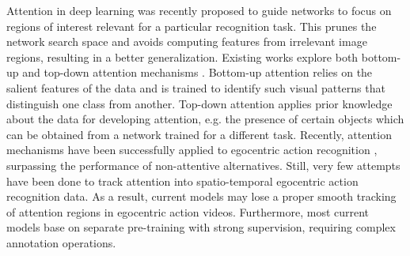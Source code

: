 \documentclass[10pt,twocolumn,letterpaper]{article}
\begin{document}
Attention in deep learning was recently proposed to guide networks to focus on regions of interest relevant for a particular recognition task. This prunes the network search space and avoids computing features from irrelevant image regions, resulting in a better generalization. Existing works explore both bottom-up \cite{attention_eccv18} and top-down attention mechanisms \cite{sudhakaran2018attention}. Bottom-up attention relies on the salient features of the data and is trained to identify such visual patterns that distinguish one class from another. Top-down attention applies prior knowledge about the data for developing attention, e.g. the presence of certain objects which can be obtained from a network trained for a different task. Recently, attention mechanisms have been successfully applied to egocentric action recognition \cite{li2018eye, sudhakaran2018attention}, surpassing the performance of non-attentive alternatives. Still, very few attempts have been done to track attention into spatio-temporal egocentric action recognition data. As a result, current models may lose a proper smooth tracking of attention regions in egocentric action videos. Furthermore, most current models base on separate pre-training with strong supervision, requiring complex annotation operations.  
\end{document}
